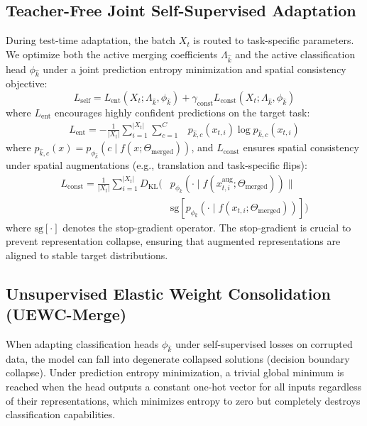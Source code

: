 \documentclass{article}
\theoremstyle{plain}
\theoremstyle{definition}
\theoremstyle{remark}
\begin{document}
\subsection{Teacher-Free Joint Self-Supervised Adaptation}
During test-time adaptation, the batch $X_t$ is routed to task-specific parameters. We optimize both the active merging coefficients $\Lambda_{\hat{k}}$ and the active classification head $\phi_{\hat{k}}$ under a joint prediction entropy minimization and spatial consistency objective:
\begin{equation}
    L_{\text{self}} = L_{\text{ent}}(X_t; \Lambda_{\hat{k}}, \phi_{\hat{k}}) + \gamma_{\text{const}} L_{\text{const}}(X_t; \Lambda_{\hat{k}}, \phi_{\hat{k}})
\end{equation}
where $L_{\text{ent}}$ encourages highly confident predictions on the target task:
\begin{equation}
\begin{split}
    L_{\text{ent}} = -\frac{1}{|X_t|} \sum_{i=1}^{|X_t|} \sum_{c=1}^C & p_{\hat{k}, c}(x_{t,i}) \log p_{\hat{k}, c}(x_{t,i})
\end{split}
\end{equation}
where $p_{\hat{k}, c}(x) = p_{\phi_{\hat{k}}}(c \mid f(x; \Theta_{\text{merged}}))$, and $L_{\text{const}}$ ensures spatial consistency under spatial augmentations (e.g., translation and task-specific flips):
\begin{equation}
\begin{split}
    L_{\text{const}} = \frac{1}{|X_t|} \sum_{i=1}^{|X_t|} D_{\text{KL}}\big(& p_{\phi_{\hat{k}}}(\cdot \mid f(x_{t,i}^{\text{aug}}; \Theta_{\text{merged}})) \parallel \\
    & \text{sg}[p_{\phi_{\hat{k}}}(\cdot \mid f(x_{t,i}; \Theta_{\text{merged}})) ]\big)
\end{split}
\end{equation}
where $\text{sg}[\cdot]$ denotes the stop-gradient operator. The stop-gradient is crucial to prevent representation collapse, ensuring that augmented representations are aligned to stable target distributions.

\subsection{Unsupervised Elastic Weight Consolidation (UEWC-Merge)}
When adapting classification heads $\phi_{\hat{k}}$ under self-supervised losses on corrupted data, the model can fall into degenerate collapsed solutions (decision boundary collapse). Under prediction entropy minimization, a trivial global minimum is reached when the head outputs a constant one-hot vector for all inputs regardless of their representations, which minimizes entropy to zero but completely destroys classification capabilities.
\end{document}
